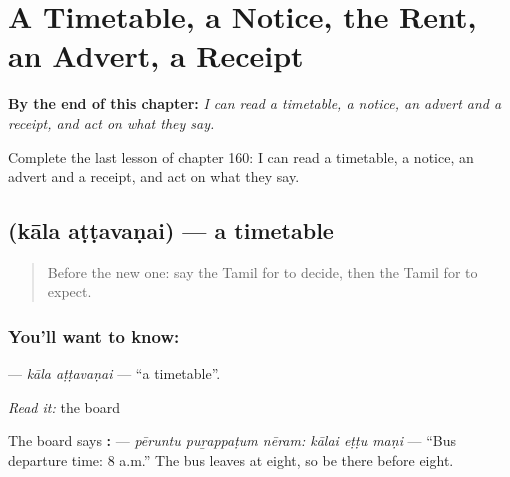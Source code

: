 
\chapter{A Timetable, a Notice, the Rent, an Advert, a Receipt}
\label{ch:ta-a-timetable-a-notice-the-rent-an-advert-a-receipt}

\begin{chapteropening}
\textbf{By the end of this chapter:} \emph{I can read a timetable, a notice, an advert and a receipt, and act on what they say.}

Complete the last lesson of chapter 160: I can read a timetable, a notice, an advert and a receipt, and act on what they say.
\end{chapteropening}

\section[\texorpdfstring{\ta{கால} \ta{அட்டவணை} (kāla aṭṭavaṇai)}{கால அட்டவணை (kāla aṭṭavaṇai)}]{  (kāla aṭṭavaṇai) — a timetable}

\label{lesson:TA-C160-kala-attavanai}



\begin{quote}
Before the new one: say the Tamil for to decide, then the Tamil for to expect.
\end{quote}

\subsection*{You'll want to know:  }
\textbf{ } — \emph{kāla aṭṭavaṇai} — \textquotedblleft{}a timetable\textquotedblright{}.

\emph{Read it:} the board

The board says \textbf{  :   } — \emph{pēruntu puṟappaṭum nēram: kālai eṭṭu maṇi} — \textquotedblleft{}Bus departure time: 8 a.m.\textquotedblright{} The bus leaves at eight, so be there before eight.

